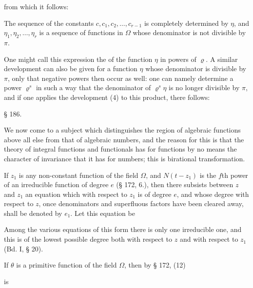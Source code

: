 

from which it follows:


The sequence of the constants $c, c_1, c_2, \ldots, c_{r-1}$ is
completely determined by $\eta$, and $\eta_1, \eta_2, \ldots, \eta_r$
is a sequence of functions in $\Omega$ whose denominator is not
divisible by $\pi$.

One might call this expression the  of the function
$\eta$ in powers of $\varrho$. A similar development can also be given
for a function $\eta$ whose denominator is divisible by $\pi$, only
that negative powers then occur as well: one can namely determine a
power $\varrho^s$ in such a way that the denominator of
$\varrho^s\eta$ is no longer divisible by $\pi$, and if one applies
the development (4) to this product, there follows:


\begin{center}
§ 186. \textbf{}
\end{center}

We now come to a subject which distinguishes the region of algebraic
functions above all else from that of algebraic numbers, and the
reason for this is that the theory of integral functions and
functionals has for functions by no means the character of invariance
that it has for numbers; this is birational transformation.

If $z_1$ is any non-constant function of the field $\Omega$, and
$N(t - z_1)$ is the $f$th power of an irreducible function of degree
$e$ (§ 172, 6.), then there subsists between $z$ and $z_1$ an
equation which with respect to $z_1$ is of degree $e$, and whose
degree with respect to $z$, once denominators and superfluous factors
have been cleared away, shall be denoted by $e_1$. Let this equation
be


Among the various equations of this form there is only one
irreducible one, and this is of the lowest possible degree both with
respect to $z$ and with respect to $z_1$ (Bd. I, § 20).

If $\theta$ is a primitive function of the field $\Omega$, then by
§ 172, (12)

is
